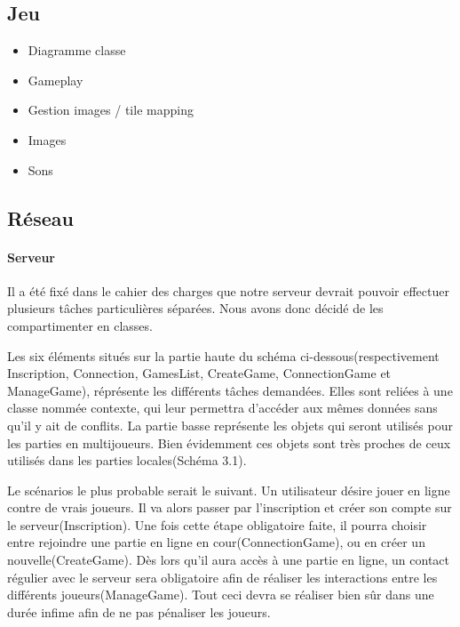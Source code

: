 \subsection{Jeu}
	\begin{itemize}
		\item{Diagramme classe}
		\item{Gameplay}
		\item{Gestion images / tile mapping}
		\item{Images}
		\item{Sons}
	\end{itemize}
			

\subsection{Réseau}
		
	\paragraph{Serveur\\}
			
		Il a été fixé dans le cahier des charges que notre serveur devrait pouvoir
		effectuer plusieurs tâches particulières séparées. Nous avons donc décidé de
		les compartimenter en classes.
			
		Les six éléments situés sur la partie haute du schéma
		ci-dessous(respectivement Inscription, Connection, GamesList, CreateGame,
		ConnectionGame et ManageGame), réprésente les différents tâches demandées.
		Elles sont reliées à une classe nommée contexte, qui leur permettra d'accéder
		aux mêmes données sans qu'il y ait de conflits. La partie basse représente les
		objets qui seront utilisés pour les parties en multijoueurs. Bien évidemment
		ces objets sont très proches de ceux utilisés dans les parties
		locales(Schéma 3.1).
		
		Le scénarios le plus probable serait le suivant. Un utilisateur désire jouer
		en ligne contre de vrais joueurs. 
		Il va alors passer par l'inscription et créer son compte sur le
		serveur(Inscription). Une fois cette étape obligatoire faite, il pourra choisir entre rejoindre une partie en ligne
		en cour(ConnectionGame), ou en créer un nouvelle(CreateGame). Dès lors qu'il
		aura accès à une partie en ligne, un contact régulier avec le serveur sera
		obligatoire afin de réaliser les interactions entre les différents
		joueurs(ManageGame). Tout ceci devra se réaliser bien sûr dans une durée
		infime afin de ne pas pénaliser les joueurs.
		
